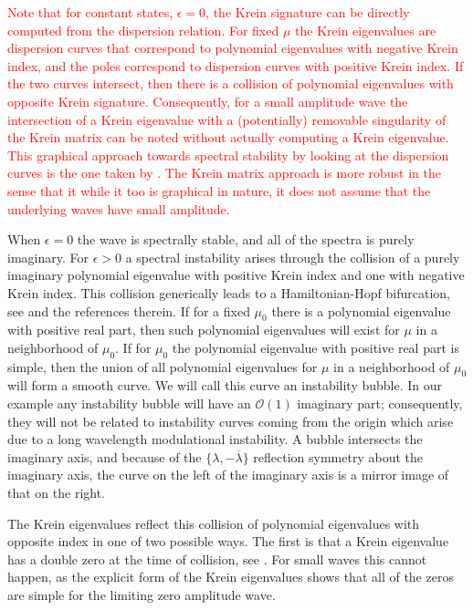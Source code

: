 \documentclass[review,onefignum,onetabnum]{siamart171218}
\newcommand{\calO}{\mathcal{O}}
\newcommand{\revised}[1]{ \textcolor{red}{#1} }
\begin{document}
\revised{
\begin{remark}
Note that for constant states, $\epsilon=0$, the Krein signature can be directly computed from the dispersion relation.  For fixed $\mu$ the Krein
eigenvalues are dispersion curves that correspond to polynomial eigenvalues
with negative Krein index, and the poles correspond to dispersion curves with
positive Krein index. If the two curves intersect, then there is a collision
of polynomial eigenvalues with opposite Krein signature. Consequently, for a small amplitude wave the intersection of a Krein eigenvalue with a (potentially) removable singularity of the Krein matrix can be noted
without actually computing a Krein eigenvalue. This graphical
approach towards spectral stability by looking at the dispersion curves is the one taken by \cite{deconinck:hfi16,kollar:dco19,trichtchenko:sop18}. The Krein matrix approach is more robust in the sense that it while it too is graphical in nature, it does not assume that the underlying waves have small amplitude.
\end{remark}
}

When $\epsilon=0$ the wave is spectrally stable, and all of the spectra is purely imaginary. For $\epsilon>0$ a spectral instability arises through the collision of a purely imaginary
polynomial eigenvalue with positive Krein index and one with negative Krein
index. This collision generically leads to a Hamiltonian-Hopf bifurcation,
see \cite[Chapter~7.1.2]{kapitula:sad13} and the references therein. If for a fixed $\mu_0$ there is a polynomial eigenvalue
with positive real part, then such polynomial eigenvalues will exist for $\mu$ in a
neighborhood of $\mu_0$. If for $\mu_0$ the polynomial eigenvalue with positive real part is simple, then the union of all polynomial eigenvalues for $\mu$ in a neighborhood of $\mu_0$ will form a smooth curve. We will call this curve an instability bubble. In our example any instability bubble will have an $\calO(1)$
imaginary part; consequently, they will not be related to instability curves coming from the origin which arise due to a long wavelength modulational instability.
A bubble intersects the imaginary axis, and because of the
$\{\lambda,-\overline{\lambda}\}$ reflection symmetry about the imaginary
axis, the curve on the left of the imaginary axis is a mirror image of that
on the right.

The Krein eigenvalues reflect this collision of polynomial eigenvalues with opposite index in one of two possible ways. The
first is that a Krein eigenvalue has a double zero at the time of collision,
see \cite[Lemma~2.8]{kapitula:tks10}. For small waves this cannot happen, as
the explicit form of the Krein eigenvalues shows that all of the zeros are
simple for the limiting zero amplitude wave.
\end{document}
